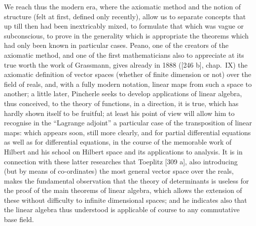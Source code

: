 We reach thus the modern era, where the axiomatic method and the notion of structure (felt at first, defined only recently), allow us to separate concepts that up till then had been inextricably mixed, to formulate that which was vague or subconscious, to prove in the generality which is appropriate the theorems which had only been known in particular cases. Peano, one of the creators of the axiomatic method, and one of the first mathematicians also to appreciate at its true worth the work of Grassmann, gives already in 1888 ({[}246 b{]}, chap.~IX) the axiomatic definition of vector spaces (whether of finite dimension or not) over the field of reals, and, with a fully modern notation, linear maps from such a space to another; a little later, Pincherle seeks to develop applications of linear algebra, thus conceived, to the theory of functions, in a direction, it is true, which has hardly shown itself to be fruitful; at least his point of view will allow him to recognise in the ``Lagrange adjoint'' a particular case of the transposition of linear maps: which appears soon, still more clearly, and for partial differential equations as well as for differential equations, in the course of the memorable work of Hilbert and his school on Hilbert space and its applications to analysis. It is in connection with these latter researches that Toeplitz {[}309 a{]}, also introducing (but by means of co-ordinates) the most general vector space over the reals, makes the fundamental observation that the theory of determinants is useless for the proof of the main theorems of linear algebra, which allows the extension of these without difficulty to infinite dimensional spaces; and he indicates also that the linear algebra thus understood is applicable of course to any commutative base field.


